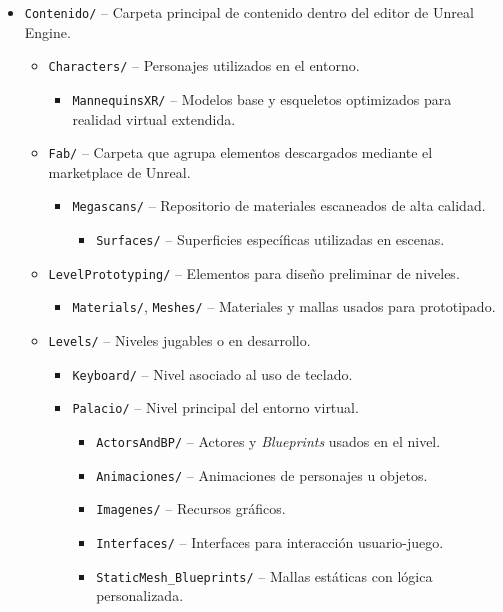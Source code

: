 \begin{itemize}
  \item \texttt{Contenido/} – Carpeta principal de contenido dentro del editor de Unreal Engine.
  \begin{itemize}
    \item \texttt{Characters/} – Personajes utilizados en el entorno.
    \begin{itemize}
      \item \texttt{MannequinsXR/} – Modelos base y esqueletos optimizados para realidad virtual extendida.
    \end{itemize}
    \item \texttt{Fab/} – Carpeta que agrupa elementos descargados mediante el marketplace de Unreal.
    \begin{itemize}
      \item \texttt{Megascans/} – Repositorio de materiales escaneados de alta calidad.
      \begin{itemize}
        \item \texttt{Surfaces/} – Superficies específicas utilizadas en escenas.
      \end{itemize}
    \end{itemize}
    \item \texttt{LevelPrototyping/} – Elementos para diseño preliminar de niveles.
    \begin{itemize}
      \item \texttt{Materials/}, \texttt{Meshes/} – Materiales y mallas usados para prototipado.
    \end{itemize}
    \item \texttt{Levels/} – Niveles jugables o en desarrollo.
    \begin{itemize}
      \item \texttt{Keyboard/} – Nivel asociado al uso de teclado.
      \item \texttt{Palacio/} – Nivel principal del entorno virtual.
      \begin{itemize}
        \item \texttt{ActorsAndBP/} – Actores y \textit{Blueprints} usados en el nivel.
        \item \texttt{Animaciones/} – Animaciones de personajes u objetos.
        \item \texttt{Imagenes/} – Recursos gráficos.
        \item \texttt{Interfaces/} – Interfaces para interacción usuario-juego.
        \item \texttt{StaticMesh\_Blueprints/} – Mallas estáticas con lógica personalizada.

\end{itemize}
\end{itemize}
\end{itemize}
\end{itemize}
